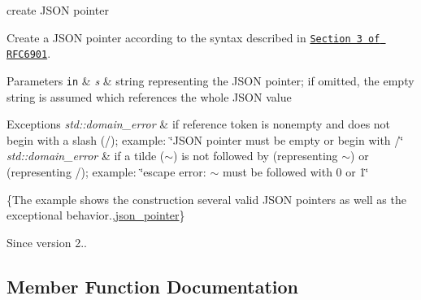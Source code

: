 create J\+S\+ON pointer 

Create a J\+S\+ON pointer according to the syntax described in \href{https://tools.ietf.org/html/rfc6901#section-3}{\tt Section 3 of R\+F\+C6901}.


\begin{DoxyParams}[1]{Parameters}
\mbox{\tt in}  & {\em s} & string representing the J\+S\+ON pointer; if omitted, the empty string is assumed which references the whole J\+S\+ON value\\
\hline
\end{DoxyParams}

\begin{DoxyExceptions}{Exceptions}
{\em std\+::domain\+\_\+error} & if reference token is nonempty and does not begin with a slash ({\ttfamily /}); example\+: {\ttfamily \char`\"{}\+J\+S\+O\+N pointer must be empty or
begin with /\char`\"{}} \\
\hline
{\em std\+::domain\+\_\+error} & if a tilde ({\ttfamily $\sim$}) is not followed by {} (representing {\ttfamily $\sim$}) or {} (representing {\ttfamily /}); example\+: {\ttfamily \char`\"{}escape error\+:
$\sim$ must be followed with 0 or 1\char`\"{}}\\
\hline
\end{DoxyExceptions}
\{The example shows the construction several valid J\+S\+ON pointers as well as the exceptional behavior.,\hyperlink{classnlohmann_1_1basic__json_1_1json__pointer}{json\+\_\+pointer}\}

\begin{DoxySince}{Since}
version 2.. 
\end{DoxySince}


\subsection{Member Function Documentation}
